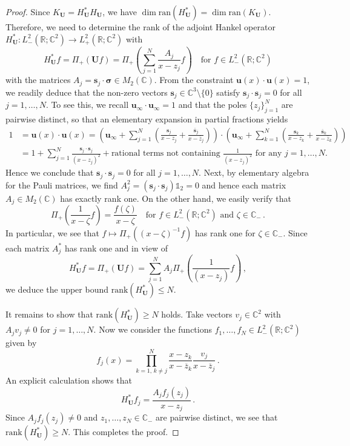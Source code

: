 \documentclass[11pt,reqno]{amsart}
\theoremstyle{definition}
\theoremstyle{remark}
\theoremstyle{remark}
\numberwithin{equation}{section}
\newcommand{\C}{\mathbb{C}}
\newcommand{\R}{\mathbb{R}}
\newcommand{\ov}{\overline}
\newcommand{\ran}{\mathrm{ran}}
\newcommand{\rank}{\mathrm{rank}}
\newcommand{\sv}{\mathbf{s}}
\newcommand{\uu}{\mathbf{u}}
\newcommand{\Ub}{\mathbf{U}}
\begin{document}
\begin{appendix}
\begin{proof}
Since $K_{\Ub} = H_{\Ub}^* H_\Ub$, we have $\dim \ran(H_{\Ub}^*) = \dim \ran (K_\Ub)$. Therefore, we need to determine the rank of the adjoint Hankel operator $H_\Ub^* : L^2_-(\R; \C^2) \to L^2_+(\R; \C^2)$ with
$$
H_{\Ub}^*f = \Pi_+ (\Ub f) = \Pi_+ \left ( \sum_{j=1}^N \frac{A_j}{x-z_j} f \right ) \quad \mbox{for $f \in L^2_-(\R; \C^2)$}
$$
with the matrices $A_j = \sv_j \cdot \bm{\sigma} \in M_2(\C)$.  From the constraint $\uu(x) \cdot \uu(x) = 1$, we readily deduce that the non-zero vectors $\sv_j \in \C^3 \setminus \{ 0 \}$ satisfy $\sv_j \cdot \sv_j = 0$ for all $j =1, \ldots, N$. To see this, we recall $\uu_\infty \cdot \uu_\infty =1$ and that the poles $\{ z_j \}_{j=1}^N$ are pairwise distinct, so that an elementary expansion in partial fractions yields
\begin{align*}
1 & = \uu(x) \cdot \uu(x) = \left (   \uu_\infty + \sum_{j=1}^N \left ( \frac{\sv_j}{x-z_j} + \frac{\ov{\sv}_j}{x-\ov{z}_j} \right ) \right ) \cdot \left (  \uu_\infty + \sum_{k=1}^N \left ( \frac{\sv_k}{x-z_k} + \frac{\ov{\sv}_k}{x-\ov{z}_k} \right ) \right ) \\
& = 1 + \sum_{j=1}^N \frac{\sv_j \cdot \sv_j}{(x-z_j)^2} + \mbox{rational terms not containing $\displaystyle \frac{1}{(x-z_j)^{2}}$ for any $j=1, \ldots, N$}.
\end{align*}
Hence we conclude that $\sv_j \cdot \sv_j = 0$ for all $j=1, \ldots, N$. Next, by elementary algebra for the Pauli matrices, we find $A_j^2=(\sv_j \cdot \sv_j) \mathds{1}_2 =0$ and hence each matrix $A_j \in M_2(\C)$ has exactly rank one. On the other hand, we easily verify that
$$
 \Pi_+ \left ( \frac{1}{x-\zeta} f \right ) = \frac{f(\zeta)}{x-\zeta} \quad \mbox{for $f \in L^2_-(\R;\C^2)$ and $\zeta  \in \C_-$} \, .
$$
In particular, we see that $f \mapsto \Pi_+((x-\zeta)^{-1} f)$ has rank one for $\zeta \in \C_-$. Since each matrix $A_j^*$ has rank one and in view of
$$
H^*_{\Ub} f = \Pi_+ (\Ub f) = \sum_{j=1}^N A_j \Pi_+\left ( \frac{1}{(x-z_j)} f \right ) \, ,
$$
we deduce the upper bound $\rank(H^*_\Ub) \leq N$.

It remains to show that $\rank(H^*_{\Ub}) \geq N$ holds. Take vectors $v_j \in \C^2$ with $A_j v_j \neq 0$ for $j=1, \ldots, N$. Now we consider the functions $f_1, \ldots, f_N \in L^2_-(\R;\C^2)$ given by
$$
f_j(x) = \prod_{k=1, \, k \neq j}^N \frac{x-z_k}{x-\ov{z}_k} \frac{v_j}{x-\ov{z}_j} \, .
$$
An explicit calculation shows that
$$
H_{\Ub}^* f_j = \frac{A_j f_j(z_j)}{x-z_j} \, .
$$
Since $A_j f_j(z_j) \neq 0$ and $z_1, \ldots, z_N \in \C_-$ are pairwise distinct, we see that $\rank(H_{\Ub}^*) \geq N$.  This completes the proof.
\end{proof}


\end{appendix}
\end{document}
